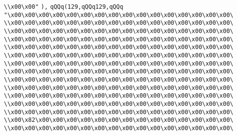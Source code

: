 \verb|\\x00\x00"|\newline
\verb|),|\newline
\verb|qQQq(129,qQQq129,qQQq|\newline
\verb|"\x00\x00\x00\x00\x00\x00\x00\x00\x00\x00\x00\x00\x00\x00\x00\x00\|\newline
\verb|\\x00\x00\x00\x00\x00\x00\x00\x00\x00\x00\x00\x00\x00\x00\x00\x00\|\newline
\verb|\\x00\x00\x00\x00\x00\x00\x00\x00\x00\x00\x00\x00\x00\x00\x00\x00\|\newline
\verb|\\x00\x00\x00\x00\x00\x00\x00\x00\x00\x00\x00\x00\x00\x00\x00\x00\|\newline
\verb|\\x00\x00\x00\x00\x00\x00\x00\x00\x00\x00\x00\x00\x00\x00\x00\x00\|\newline
\verb|\\x00\x00\x00\x00\x00\x00\x00\x00\x00\x00\x00\x00\x00\x00\x00\x00\|\newline
\verb|\\x00\x00\x00\x00\x00\x00\x00\x00\x00\x00\x00\x00\x00\x00\x00\x00\|\newline
\verb|\\x00\x00\x00\x00\x00\x00\x00\x00\x00\x00\x00\x00\x00\x00\x00\x00\|\newline
\verb|\\x00\x00\x00\x00\x00\x00\x00\x00\x00\x00\x00\x00\x00\x00\x00\x00\|\newline
\verb|\\x00\x00\x00\x00\x00\x00\x00\x00\x00\x00\x00\x00\x00\x00\x00\x00\|\newline
\verb|\\x00\x00\x00\x00\x00\x00\x00\x00\x00\x00\x00\x00\x00\x00\x00\x00\|\newline
\verb|\\x00\x00\x00\x00\x00\x00\x00\x00\x00\x00\x00\x00\x00\x00\x00\x00\|\newline
\verb|\\x00\x00\x00\x00\x00\x00\x00\x00\x00\x00\x00\x00\x00\x00\x00\x00\|\newline
\verb|\\x00\x82\x00\x00\x00\x00\x00\x00\x00\x00\x00\x00\x00\x00\x00\x00\|\newline
\verb|\\x00\x00\x00\x00\x00\x00\x00\x00\x00\x00\x00\x00\x00\x00\x00\x00\|\newline
